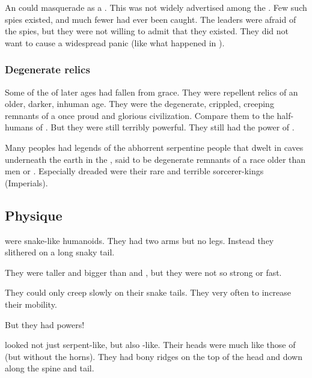 An \ophidian could masquerade as a \bezed. 
This was not widely advertised among the \resphain.
Few such spies existed, and much fewer had ever been caught. 
The \resphan leaders were afraid of the spies, but they were not willing to admit that they existed.
They did not want to cause a widespread panic (like what happened in \cite{TV:BattlestarGalactica}).





\subsubsection{Degenerate relics}
Some of the \ophidian {} of later ages had fallen from grace.
They were repellent relics of an older, darker, inhuman age. 
They were the degenerate, crippled, creeping remnants of a once proud and glorious civilization. 
Compare them to the half-humans of \cite{RobertEHoward:WormsoftheEarth}. 
But they were still terribly powerful.
They still had the power of . 

Many peoples had legends of the abhorrent serpentine people that dwelt in caves underneath the earth in the \wylde, said to be degenerate remnants of a race older than men or \scathae. 
Especially dreaded were their rare and terrible sorcerer-kings (Imperials).









\subsection{Physique}
\Ophidians were snake-like humanoids. 
They had two arms but no legs. 
Instead they slithered on a long snaky tail. 

They were taller and bigger than \humans{} and \scathae, but they were not so strong or fast. 

They could only creep slowly on their snake tails. 
They very often  to increase their mobility. 

But they had  powers! 

\Ophidians looked not just serpent-like, but also \dragon-like. 
Their heads were much like those of \dragons (but without the horns). 
They had bony ridges on the top of the head and down along the spine and tail. 


